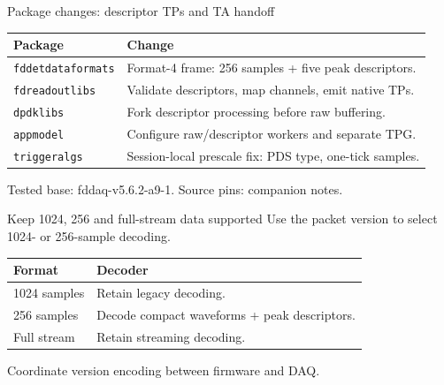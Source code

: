 \documentclass[aspectratio=169,11pt]{beamer}
\begin{document}
\begin{frame}{Package changes: descriptor TPs and TA handoff}
  \renewcommand{\arraystretch}{1.5}
  \begin{tabularx}{\textwidth}{@{}lX@{}}
    \toprule
    Package & Change \\
    \midrule
    \texttt{fddetdataformats} & Format-4 frame: 256 samples + five peak descriptors. \\
    \texttt{fdreadoutlibs} & Validate descriptors, map channels, emit native TPs. \\
    \texttt{dpdklibs} & Fork descriptor processing before raw buffering. \\
    \texttt{appmodel} & Configure raw/descriptor workers and separate TPG. \\
    \texttt{triggeralgs} & Session-local prescale fix: PDS type, one-tick samples. \\
    \bottomrule
  \end{tabularx}
  \bigskip
  {\small\color{DuneTextMuted}Tested base: fddaq-v5.6.2-a9-1. Source pins: companion notes.}
\end{frame}

\begin{frame}{Keep 1024, 256 and full-stream data supported}
    {Use the packet version to select 1024- or 256-sample decoding.}
  \bigskip
  \renewcommand{\arraystretch}{1.35}
  \begin{tabularx}{\textwidth}{@{}lX@{}}
    \toprule
    Format & Decoder \\
    \midrule
    1024 samples & Retain legacy decoding. \\
    256 samples & Decode compact waveforms + peak descriptors. \\
    Full stream & Retain streaming decoding. \\
    \bottomrule
  \end{tabularx}
  \bigskip
  Coordinate version encoding between firmware and DAQ.
\end{frame}
\end{document}
